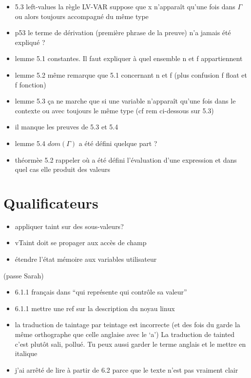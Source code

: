 \begin{itemize}
\item
  5.3 left-values la règle LV-VAR suppose que x n'apparaît qu'une fois
  dans $\Gamma$ ou alors toujours accompagné du même type
\item
  p53 le terme de dérivation (première phrase de la preuve) n'a jamais
  été expliqué ?
\item
  lemme 5.1 constantes. Il faut expliquer à quel ensemble n et f
  appartiennent
\item
  lemme 5.2 même remarque que 5.1 concernant n et f (plus confusion f
  float et f fonction)
\item
  lemme 5.3 ça ne marche que si une variable n'apparaît qu'une fois dans
  le contexte ou avec toujours le même type (cf rem ci-dessous sur 5.3)
\item
  il manque les preuves de 5.3 et 5.4
\item
  lemme 5.4 $dom(\Gamma)$ a été défini quelque part ?
\item
  théormèe 5.2 rappeler où a été défini l'évaluation d'une expression et
  dans quel cas elle produit des valeurs
\end{itemize}%

\section{Qualificateurs}%

\begin{itemize}
\item appliquer taint sur des sous-valeurs?
\item vTaint doit se propager aux accès de champ
\item étendre l'état mémoire aux variables utilisateur
\end{itemize}

(passe Sarah)

\begin{itemize}
\item
  6.1.1 français dans ``qui représente qui contrôle sa valeur''
\item
  6.1.1 mettre une ref sur la description du noyau linux
\item
  la traduction de taintage par teintage est incorrecte (et des fois du
  garde la même orthographe que celle anglaise avec le `a') La
  traduction de tainted c'est plutôt sali, pollué. Tu peux aussi garder
  le terme anglais et le mettre en italique
\item
  j'ai arrêté de lire à partir de 6.2 parce que le texte n'est pas
  vraiment clair
\end{itemize}


